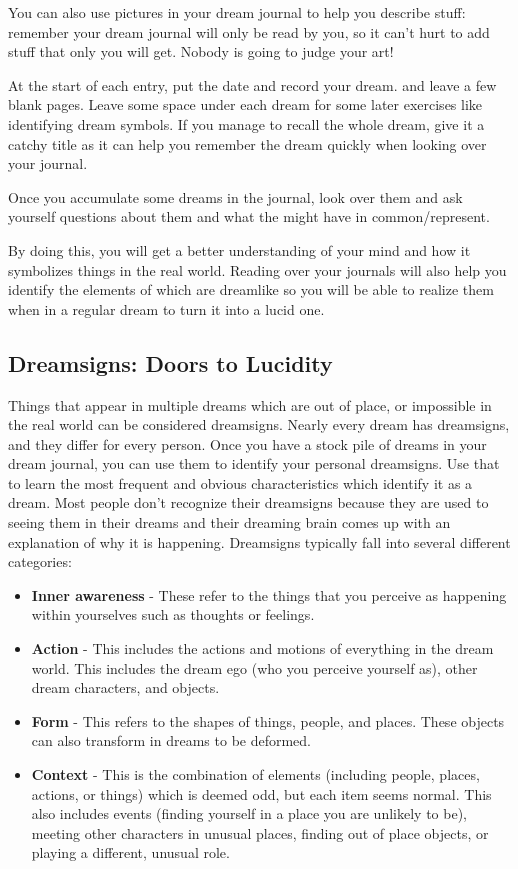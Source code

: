 \documentclass{article}
\begin{document}
You can also use pictures in your dream journal to help you describe stuff: remember your dream journal will only be read by you, so it can't hurt to add stuff that only you will get. Nobody is going to judge your art!

At the start of each entry, put the date and record your dream. and leave a few blank pages. Leave some space under each dream for some later exercises like identifying dream symbols. If you manage to recall the whole dream, give it a catchy title as it can help you remember the dream quickly when looking over your journal.

Once you accumulate some dreams in the journal, look over them and ask yourself questions about them and what the might have in common/represent.

By doing this, you will get a better understanding of your mind and how it symbolizes things in the real world. Reading over your journals will also help you identify the elements of which are dreamlike so you will be able to realize them when in a regular dream to turn it into a lucid one.

\subsection{Dreamsigns: Doors to Lucidity}
Things that appear in multiple dreams which are out of place, or impossible in the real world can be considered dreamsigns. Nearly every dream has dreamsigns, and they differ for every person. Once you have a stock pile of dreams in your dream journal, you can use them to identify your personal dreamsigns. Use that to learn the most frequent and obvious characteristics which identify it as a dream. Most people don't recognize their dreamsigns because they are used to seeing them in their dreams and their dreaming brain comes up with an explanation of why it is happening. Dreamsigns typically fall into several different categories:
\begin{itemize}
  \item \textbf{Inner awareness} - These refer to the things that you perceive as happening within yourselves such as thoughts or feelings.
  \item \textbf{Action} - This includes the actions and motions of everything in the dream world. This includes the dream ego (who you perceive yourself as), other dream characters, and objects.
  \item \textbf{Form} - This refers to the shapes of things, people, and places. These objects can also transform in dreams to be deformed.
  \item \textbf{Context} - This is the combination of elements (including people, places, actions, or things) which is deemed odd, but each item seems normal. This also includes events (finding yourself in a place you are unlikely to be), meeting other characters in unusual places, finding out of place objects, or playing a different, unusual role.
\end{itemize}
\end{document}
